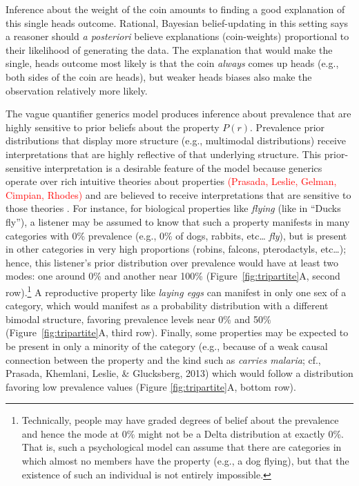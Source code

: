 \documentclass[floatsintext,doc]{apa6}
\let\rmarkdownfootnote\footnote%
\def\footnote{\protect\rmarkdownfootnote}
\newcommand{\red}[1]{{\textcolor{Red}{#1}}}
\begin{document}
Inference about the weight of the coin amounts to finding a good explanation of this single heads outcome.
Rational, Bayesian belief-updating in this setting says a reasoner should \emph{a posteriori} believe explanations (coin-weights) proportional to their likelihood of generating the data.
The explanation that would make the single, heads outcome most likely is that the coin \emph{always} comes up heads (e.g., both sides of the coin are heads), but weaker heads biases also make the observation relatively more likely.

 
 The vague quantifier generics model produces inference about prevalence that are highly sensitive to prior beliefs about the property $P(r)$. 
 Prevalence prior distributions that display more structure (e.g., multimodal distributions) receive interpretations that are highly reflective of that underlying structure.
 This prior-sensitive interpretation is a desirable feature of the model because generics operate over rich intuitive theories about properties \red{(Prasada, Leslie, Gelman, Cimpian, Rhodes)}  and are believed to receive interpretations that are sensitive to those theories \cite{Cimpian2010}. 
 For instance, for biological properties like \emph{flying} (like in ``Ducks fly''), a listener may be assumed to know that such a property manifests in many categories with 0\% prevalence (e.g., 0\% of dogs, rabbits, etc\ldots{} \emph{fly}), but is present in other categories in very high proportions (robins, falcons, pterodactyls, etc\ldots{}); hence, this listener's prior distribution over prevalence would have at least two modes: one around 0\% and another near 100\% (Figure~\ref{fig:tripartite}A, second row).\footnote{
	Technically, people may have graded degrees of belief about the prevalence and hence the mode at 0\% might not be a Delta distribution at exactly 0\%. That is, such a psychological model can assume that there are categories in which almost no members have the property (e.g., a dog flying), but that the existence of such an individual is not entirely impossible.}
A reproductive property like \emph{laying eggs} can manifest in only one sex of a category, which would manifest as a probability distribution with a different bimodal structure, favoring prevalence levels near 0\% and 50\% (Figure~\ref{fig:tripartite}A, third row).  
Finally, some properties may be expected to be present in only a minority of the category (e.g., because of a weak causal connection between the property and the kind such as \emph{carries malaria}; cf., Prasada, Khemlani, Leslie, \& Glucksberg, 2013) which would follow a distribution  favoring low prevalence values (Figure \ref{fig:tripartite}A, bottom row). 
\end{document}
